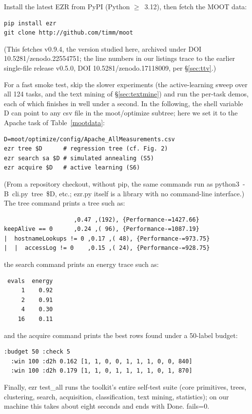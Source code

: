 \documentclass[AMA,STIX2COL]{WileyNJDv5}
\newcommand{\IT}{{\sffamily EZR}}
\begin{document}
Install the latest \IT{} from PyPI (Python $\geq$~3.12), then
fetch the MOOT data:
\begin{verbatim}
pip install ezr
git clone http://github.com/timm/moot
\end{verbatim}
(This fetches \textsf{v0.9.4}, the version studied here,
archived under DOI \textsf{10.5281/zenodo.22554751}; the
line numbers in our listings trace to the earlier single-file
release \textsf{v0.5.0}, DOI
\textsf{10.5281/zenodo.17118009}, per \S\ref{sec:ttv}.)

For a fast smoke test, skip the slower experiments (the
active-learning sweep over all 124 tasks, and the text mining of
\S\ref{sec:textmine}) and run the per-task demos, each of which
finishes in well under a second. In the following, the shell
variable \textsf{D} can point to any csv file in the
\textsf{moot/optimize} subtree; here we
set it to the Apache task of Table~\ref{mootdata}:
\begin{verbatim}
D=moot/optimize/config/Apache_AllMeasurements.csv
ezr tree $D      # regression tree (cf. Fig. 2)
ezr search sa $D # simulated annealing (S5)
ezr acquire $D   # active learning (S6)
\end{verbatim}
(From a repository checkout, without \textsf{pip}, the same
commands run as \mbox{\textsf{python3 -B cli.py tree \$D}},
etc.; \textsf{ezr.py} itself is a library with no command-line
interface.)
The tree command prints a tree such as:
\begin{verbatim}
                    ,0.47 ,(192), {Performance-=1427.66}
keepAlive == 0      ,0.24 ,( 96), {Performance-=1087.19}
|  hostnameLookups != 0 ,0.17 ,( 48), {Performance-=973.75}
|  |  accessLog != 0    ,0.15 ,( 24), {Performance-=928.75}
\end{verbatim}
the search command prints an energy trace such as:
\begin{verbatim}
 evals  energy
     1    0.92
     2    0.91
     4    0.30
    16    0.11
\end{verbatim}
and the acquire command prints the best rows found under a
50-label budget:
\begin{verbatim}
:budget 50 :check 5
  :win 100 :d2h 0.162 [1, 1, 0, 0, 1, 1, 1, 0, 0, 840]
  :win 100 :d2h 0.179 [1, 1, 0, 1, 1, 1, 1, 0, 1, 870]
\end{verbatim}
Finally, \textsf{ezr test\_all} runs the toolkit's entire
self-test suite (core primitives, trees, clustering, search,
acquisition, classification, text mining, statistics); on our
machine this takes about eight seconds and ends with
\textsf{Done. fails=0}.
\end{document}

